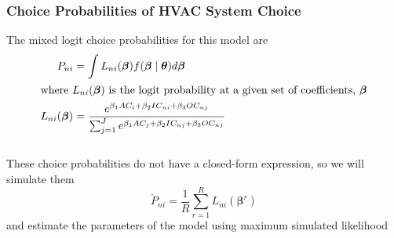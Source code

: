 \documentclass{beamer}\usepackage[]{graphicx}\usepackage[]{color}
\begin{document}
\begin{frame}\frametitle{Choice Probabilities of HVAC System Choice}
	The mixed logit choice probabilities for this model are
    \begin{align*}
        P_{ni} & = \int L_{ni}(\bm{\beta}) f(\bm{\beta} \mid \bm{\theta}) d \bm{\beta} \\
        \intertext{where $L_{ni}(\bm{\beta})$ is the logit probability at a given set of coefficients, $\bm{\beta}$}
        L_{ni}(\bm{\beta}) & = \frac{e^{\beta_1 AC_i + \beta_2 IC_{ni} + \beta_3 OC_{nj}}}{\sum_{j = 1}^J e^{\beta_1 AC_j + \beta_2 IC_{nj} + \beta_3 OC_{nj}}}
    \end{align*} \\
    \vspace{3ex}
    These choice probabilities do not have a closed-form expression, so we will simulate them
    $$\check{P}_{ni} = \frac{1}{R} \sum_{r = 1}^R L_{ni}(\bm{\beta}^r)$$
    and estimate the parameters of the model using maximum simulated likelihood
\end{frame}
\end{document}
